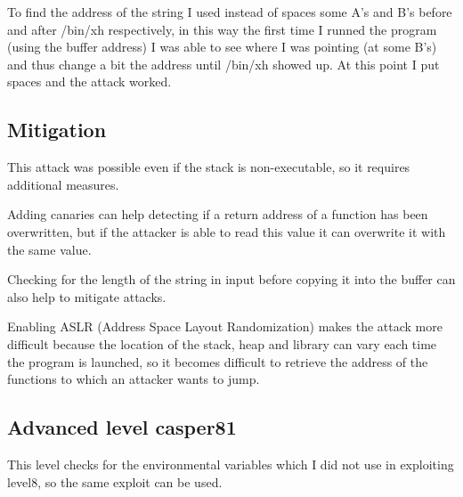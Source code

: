 \documentclass[a4paper,12pt]{article}
\begin{document}
To find the address of the string I used instead of spaces some A's and B's before and after /bin/xh respectively, in this way the first time I runned the program (using the buffer address) I was able to see where I was pointing (at some B's) and thus change a bit the address until /bin/xh showed up. At this point I put spaces and the attack worked.







\subsection{Mitigation}

This attack was possible even if the stack is non-executable, so it requires additional measures.

Adding canaries can help detecting if a return address of a function has been overwritten, but if the attacker is able to read this value it can overwrite it with the same value.

Checking for the length of the string in input before copying it into the buffer can also help to mitigate attacks.

Enabling ASLR (Address Space Layout Randomization) makes the attack more difficult because the location of the stack, heap and library can vary each time the program is launched, so it becomes difficult to retrieve the address of the functions to which an attacker wants to jump.

\subsection{Advanced level casper81}

This level checks for the environmental variables which I did not use in exploiting level8, so the same exploit can be used.
\end{document}
